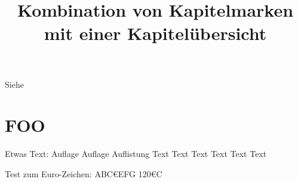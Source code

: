 \documentclass{dtk}
\begin{document}
\title[Kurztitel 1]{Kombination von Kapitelmarken mit einer Kapitelübersicht}

\maketitle
\nocite{*}
Siehe~\cite{knuth:ct:a}

\section{FOO}

Etwas Text: Auflage Auf\-\hspace{0pt}lage Auflistung Text Text Text
Text Text Text

\bigskip

Test zum Euro-Zeichen: \Huge ABC€EFG 120€C

\clearpage

\printbibliography
\end{document}
